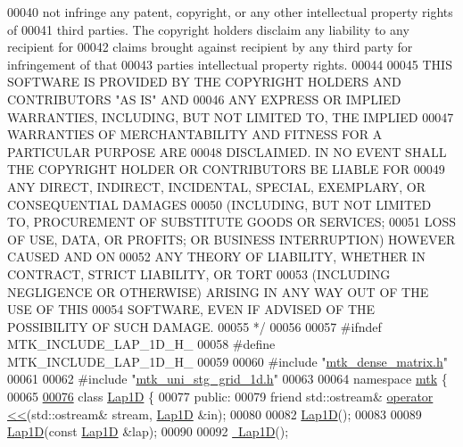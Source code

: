 \begin{DoxyCode}
00040 \textcolor{comment}{not infringe any patent, copyright, or any other intellectual property rights of}
00041 \textcolor{comment}{third parties. The copyright holders disclaim any liability to any recipient for}
00042 \textcolor{comment}{claims brought against recipient by any third party for infringement of that}
00043 \textcolor{comment}{parties intellectual property rights.}
00044 \textcolor{comment}{}
00045 \textcolor{comment}{THIS SOFTWARE IS PROVIDED BY THE COPYRIGHT HOLDERS AND CONTRIBUTORS "AS IS" AND}
00046 \textcolor{comment}{ANY EXPRESS OR IMPLIED WARRANTIES, INCLUDING, BUT NOT LIMITED TO, THE IMPLIED}
00047 \textcolor{comment}{WARRANTIES OF MERCHANTABILITY AND FITNESS FOR A PARTICULAR PURPOSE ARE}
00048 \textcolor{comment}{DISCLAIMED. IN NO EVENT SHALL THE COPYRIGHT HOLDER OR CONTRIBUTORS BE LIABLE FOR}
00049 \textcolor{comment}{ANY DIRECT, INDIRECT, INCIDENTAL, SPECIAL, EXEMPLARY, OR CONSEQUENTIAL DAMAGES}
00050 \textcolor{comment}{(INCLUDING, BUT NOT LIMITED TO, PROCUREMENT OF SUBSTITUTE GOODS OR SERVICES;}
00051 \textcolor{comment}{LOSS OF USE, DATA, OR PROFITS; OR BUSINESS INTERRUPTION) HOWEVER CAUSED AND ON}
00052 \textcolor{comment}{ANY THEORY OF LIABILITY, WHETHER IN CONTRACT, STRICT LIABILITY, OR TORT}
00053 \textcolor{comment}{(INCLUDING NEGLIGENCE OR OTHERWISE) ARISING IN ANY WAY OUT OF THE USE OF THIS}
00054 \textcolor{comment}{SOFTWARE, EVEN IF ADVISED OF THE POSSIBILITY OF SUCH DAMAGE.}
00055 \textcolor{comment}{*/}
00056 
00057 \textcolor{preprocessor}{#ifndef MTK\_INCLUDE\_LAP\_1D\_H\_}
00058 \textcolor{preprocessor}{#define MTK\_INCLUDE\_LAP\_1D\_H\_}
00059 
00060 \textcolor{preprocessor}{#include "\hyperlink{mtk__dense__matrix_8h}{mtk\_dense\_matrix.h}"}
00061 
00062 \textcolor{preprocessor}{#include "\hyperlink{mtk__uni__stg__grid__1d_8h}{mtk\_uni\_stg\_grid\_1d.h}"}
00063 
00064 \textcolor{keyword}{namespace }\hyperlink{namespacemtk}{mtk} \{
00065 
\hypertarget{mtk__lap__1d_8h_source_l00076}{}\hyperlink{classmtk_1_1Lap1D}{00076} \textcolor{keyword}{class }\hyperlink{classmtk_1_1Lap1D}{Lap1D} \{
00077  \textcolor{keyword}{public}:
00079   \textcolor{keyword}{friend} std::ostream& \hyperlink{classmtk_1_1Lap1D_a235390479381d4e95163674968a1ca7c}{operator <<}(std::ostream& stream, \hyperlink{classmtk_1_1Lap1D}{Lap1D} &in);
00080 
00082   \hyperlink{classmtk_1_1Lap1D_a6fc2aeea35d4dfa49f17e625411f5a70}{Lap1D}();
00083 
00089   \hyperlink{classmtk_1_1Lap1D_a6fc2aeea35d4dfa49f17e625411f5a70}{Lap1D}(\textcolor{keyword}{const} \hyperlink{classmtk_1_1Lap1D}{Lap1D} &lap);
00090 
00092   \hyperlink{classmtk_1_1Lap1D_ac0cb868243a66658cc46de5b818fa4e8}{~Lap1D}();

\end{DoxyCode}
